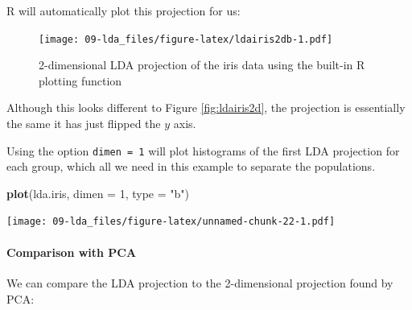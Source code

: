 \documentclass[
]{book}
\newenvironment{Shaded}{\begin{snugshade}}{\end{snugshade}}
\newcommand{\AttributeTok}[1]{\textcolor[rgb]{0.13,0.29,0.53}{#1}}
\newcommand{\DecValTok}[1]{\textcolor[rgb]{0.00,0.00,0.81}{#1}}
\newcommand{\FunctionTok}[1]{\textcolor[rgb]{0.13,0.29,0.53}{\textbf{#1}}}
\newcommand{\NormalTok}[1]{#1}
\newcommand{\OtherTok}[1]{\textcolor[rgb]{0.56,0.35,0.01}{#1}}
\newcommand{\SpecialCharTok}[1]{\textcolor[rgb]{0.81,0.36,0.00}{\textbf{#1}}}
\newcommand{\StringTok}[1]{\textcolor[rgb]{0.31,0.60,0.02}{#1}}
\theoremstyle{definition}
\theoremstyle{definition}
\theoremstyle{definition}
\theoremstyle{definition}
\theoremstyle{remark}
\begin{document}
R will automatically plot this projection for us:

\begin{Shaded}
\end{Shaded}

\begin{figure}
\centering
\texttt{[image: 09-lda\_files/figure-latex/ldairis2db-1.pdf]}
\caption{\label{fig:ldairis2db}2-dimensional LDA projection of the iris data using the built-in R plotting function}
\end{figure}

Although this looks different to Figure \ref{fig:ldairis2d}, the projection is essentially the same it has just flipped the \(y\) axis.

Using the option \texttt{dimen\ =\ 1} will plot histograms of the first LDA projection for each group, which all we need in this example to separate the populations.

\begin{Shaded}
\begin{Highlighting}[]
\FunctionTok{plot}\NormalTok{(lda.iris, }\AttributeTok{dimen =} \DecValTok{1}\NormalTok{, }\AttributeTok{type =} \StringTok{"b"}\NormalTok{)}
\end{Highlighting}
\end{Shaded}

\texttt{[image: 09-lda\_files/figure-latex/unnamed-chunk-22-1.pdf]}

\hypertarget{comparison-with-pca}{%
\paragraph*{Comparison with PCA}\label{comparison-with-pca}}

We can compare the LDA projection to the 2-dimensional projection found by PCA:
\end{document}
